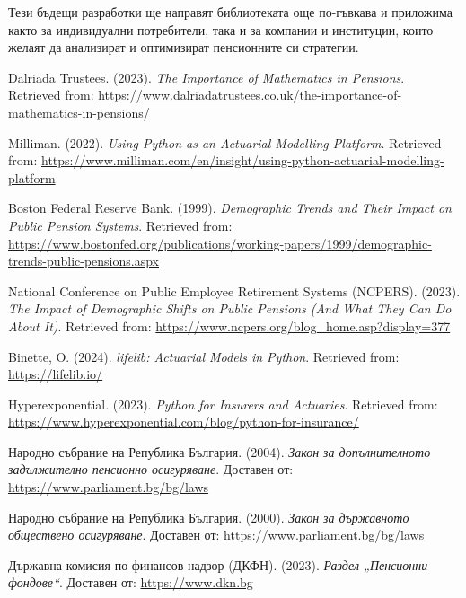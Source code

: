 \documentclass[a4paper,12pt]{article}
\begin{document}
Тези бъдещи разработки ще направят библиотеката още по-гъвкава и приложима както за индивидуални потребители, така и за компании и институции, които желаят да анализират и оптимизират пенсионните си стратегии.
\begin{thebibliography}{99}
        Dalriada Trustees. (2023).
        \emph{The Importance of Mathematics in Pensions}.
        Retrieved from: \url{https://www.dalriadatrustees.co.uk/the-importance-of-mathematics-in-pensions/}

        Milliman. (2022).
        \emph{Using Python as an Actuarial Modelling Platform}.
        Retrieved from: \url{https://www.milliman.com/en/insight/using-python-actuarial-modelling-platform}

        Boston Federal Reserve Bank. (1999).
        \emph{Demographic Trends and Their Impact on Public Pension Systems}.
        Retrieved from: \url{https://www.bostonfed.org/publications/working-papers/1999/demographic-trends-public-pensions.aspx}

        National Conference on Public Employee Retirement Systems (NCPERS). (2023).
        \emph{The Impact of Demographic Shifts on Public Pensions (And What They Can Do About It)}.
        Retrieved from: \url{https://www.ncpers.org/blog_home.asp?display=377}

        Binette, O. (2024).
        \emph{lifelib: Actuarial Models in Python}.
        Retrieved from: \url{https://lifelib.io/}

        Hyperexponential. (2023).
        \emph{Python for Insurers and Actuaries}.
        Retrieved from: \url{https://www.hyperexponential.com/blog/python-for-insurance/}

        Народно събрание на Република България. (2004).
        \emph{Закон за допълнителното задължително пенсионно осигуряване}.
        Доставен от: \url{https://www.parliament.bg/bg/laws}

        Народно събрание на Република България. (2000).
        \emph{Закон за държавното обществено осигуряване}.
        Доставен от: \url{https://www.parliament.bg/bg/laws}

        Държавна комисия по финансов надзор (ДКФН). (2023).
        \emph{Раздел „Пенсионни фондове“}.
        Доставен от: \url{https://www.dkn.bg}


\end{thebibliography}
\end{document}
